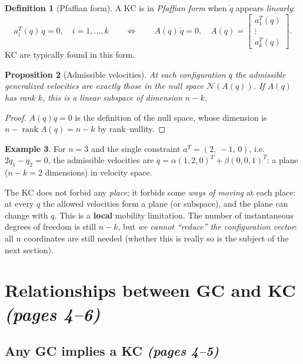 \documentclass[11pt,a4paper]{article}
\theoremstyle{definition}
\newtheorem{definition}{Definition}[section]
\newtheorem{example}[definition]{Example}
\theoremstyle{plain}
\newtheorem{proposition}[definition]{Proposition}
\begin{document}
\begin{definition}[Pfaffian form]
A KC is in \emph{Pfaffian form} when $\dot q$ appears \emph{linearly}:
\[
a_i^{T}(q)\,\dot q=0,\quad i=1,\dots,k
\qquad\Longleftrightarrow\qquad
A(q)\,\dot q=0,\quad A(q)=\begin{bmatrix}a_1^{T}(q)\\ \vdots\\ a_k^{T}(q)\end{bmatrix}.
\]
KC are typically found in this form.
\end{definition}
 
\begin{proposition}[Admissible velocities]
At each configuration $q$ the admissible generalized velocities are exactly those in the null space $\mathcal N(A(q))$. If $A(q)$ has rank $k$, this is a linear subspace of dimension $n-k$.
\end{proposition}
\begin{proof}
$A(q)\dot q=0$ is the definition of the null space, whose dimension is $n-\operatorname{rank}A(q)=n-k$ by rank--nullity.
\end{proof}
 
\begin{example}
For $n=3$ and the single constraint $a^{T}=(2,\,-1,\,0)$, i.e.\ $2\dot q_1-\dot q_2=0$, the admissible velocities are $\dot q=\alpha(1,2,0)^{T}+\beta(0,0,1)^{T}$: a plane ($n-k=2$ dimensions) in velocity space.
\end{example}
 
\begin{intuition}
The KC does not forbid any \emph{place}; it forbids some \emph{ways of moving} at each place: at every $q$ the allowed velocities form a plane (or subspace), and the plane can change with $q$. This is a \textbf{local} mobility limitation. The number of instantaneous degrees of freedom is still $n-k$, but \emph{we cannot ``reduce'' the configuration vector}: all $n$ coordinates are still needed (whether this is really so is the subject of the next section).
\end{intuition}
 
\section{Relationships between GC and KC \emph{(pages 4--6)}}
 
\subsection{Any GC implies a KC \emph{(pages 4--5)}}
 
\end{document}
